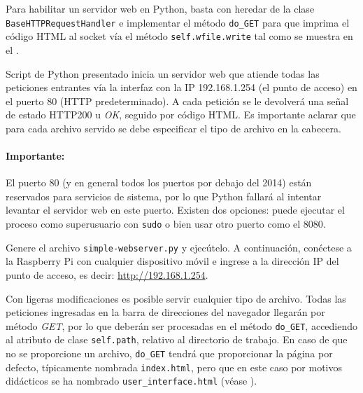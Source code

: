 \documentclass[letterpaper,10.5pt]{article}
\begin{document}
Para habilitar un servidor web en Python, basta con heredar de la clase \texttt{BaseHTTPRequestHandler} e implementar el método \texttt{do\_GET} para que imprima el código HTML al socket vía el método \texttt{self.wfile.write} tal como se muestra en el .



Script de Python presentado inicia un servidor web que atiende todas las peticiones entrantes vía la interfaz con la IP 192.168.1.254 (el punto de acceso) en el puerto 80 (HTTP predeterminado).
A cada petición se le devolverá una señal de estado HTTP200 u \emph{OK}, seguido por código HTML. %
Es importante aclarar que para cada archivo servido se debe especificar el tipo de archivo en la cabecera.

\paragraph*{Importante:} El puerto 80 (y en general todos los puertos por debajo del 2014) están reservados para servicios de sistema, por lo que Python fallará al intentar levantar el servidor web en este puerto. Existen dos opciones: puede ejecutar el proceso como superusuario con \texttt{sudo} o bien usar otro puerto como el 8080.

Genere el archivo \texttt{simple-webserver.py} y ejecútelo.
A continuación, conéctese a la Raspberry Pi con cualquier dispositivo móvil e ingrese a la dirección IP del punto de acceso, es decir: \url{http://192.168.1.254}.


Con ligeras modificaciones es posible servir cualquier tipo de archivo.
Todas las peticiones ingresadas en la barra de direcciones del navegador llegarán por método \emph{GET}, por lo que deberán ser procesadas en el método \texttt{do\_GET}, accediendo al atributo de clase \texttt{self.path}, relativo al directorio de trabajo.
En caso de que no se proporcione un archivo, \texttt{do\_GET} tendrá que proporcionar la página por defecto, típicamente nombrada \texttt{index.html}, pero que en este caso por motivos didácticos se ha nombrado \texttt{user\_interface.html} (véase ).


\end{document}
